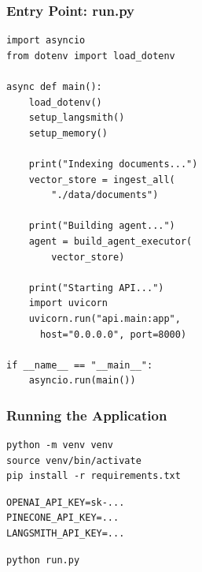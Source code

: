\documentclass[aspectratio=169,11pt]{beamer}
\begin{document}
\begin{frame}[fragile]
  \frametitle{Entry Point: run.py}

  \begin{lstlisting}
import asyncio
from dotenv import load_dotenv

async def main():
    load_dotenv()
    setup_langsmith()
    setup_memory()

    print("Indexing documents...")
    vector_store = ingest_all(
        "./data/documents")

    print("Building agent...")
    agent = build_agent_executor(
        vector_store)

    print("Starting API...")
    import uvicorn
    uvicorn.run("api.main:app",
      host="0.0.0.0", port=8000)

if __name__ == "__main__":
    asyncio.run(main())
  \end{lstlisting}
\end{frame}

\begin{frame}[fragile]
  \frametitle{Running the Application}

  \begin{conceptbox}
    \tiny
    \begin{lstlisting}
python -m venv venv
source venv/bin/activate
pip install -r requirements.txt
    \end{lstlisting}
  \end{conceptbox}

  \begin{conceptbox}
    \tiny
    \begin{lstlisting}
OPENAI_API_KEY=sk-...
PINECONE_API_KEY=...
LANGSMITH_API_KEY=...
    \end{lstlisting}
  \end{conceptbox}

  \begin{conceptbox}
    \tiny
    \begin{lstlisting}
python run.py
    \end{lstlisting}
  \end{conceptbox}
\vspace{-0.2cm}
\end{frame}
\end{document}

